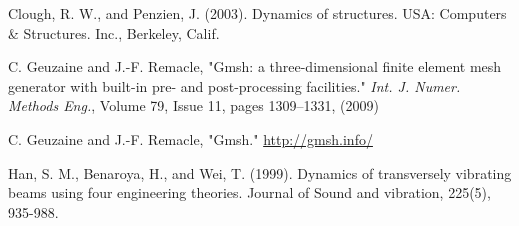\documentclass[a4]{article}
\begin{document}
\begin{thebibliography}{99}
	
	 Clough, R. W., and Penzien, J. (2003). Dynamics of structures. USA: Computers \& Structures. Inc., Berkeley, Calif.
	
	 C. Geuzaine and J.-F. Remacle, "Gmsh: a three-dimensional finite element mesh generator with built-in pre- and post-processing facilities." \emph{Int. J. Numer. Methods Eng.}, Volume 79, Issue 11, pages 1309--1331, (2009)
	
	  C. Geuzaine and J.-F. Remacle, "Gmsh." \url{http://gmsh.info/}
	
	 Han, S. M., Benaroya, H., and Wei, T. (1999). Dynamics of transversely vibrating beams using four engineering theories. Journal of Sound and vibration, 225(5), 935-988.
\end{thebibliography}
\end{document}
